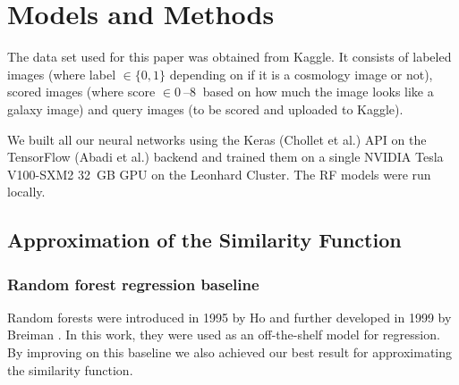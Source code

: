 \documentclass[10pt,conference,compsocconf]{IEEEtran}
\begin{document}


\section{Models and Methods} \label{sec:models_methods}
The data set used for this paper was obtained from Kaggle. It consists of labeled images (where label $\in \{0,1\}$ depending on if it is a cosmology image or not), scored images (where score $\in \SIrange{0}{8}{}$ based on how much the image looks like a galaxy image) and query images (to be scored and uploaded to Kaggle).

We built all our neural networks using the Keras (Chollet et al.\@ \cite{chollet2015keras}) API on the TensorFlow (Abadi et al.\@ \cite{tensorflow2015-whitepaper}) backend and trained them on a single NVIDIA Tesla V100-SXM2 \SI{32}{GB} GPU on the Leonhard Cluster. The RF models were run locally.

\subsection{Approximation of the Similarity Function}

\subsubsection{Random forest regression baseline} 
Random forests were introduced in 1995 by Ho \cite{Ho} and further developed in 1999 by Breiman \cite{Breiman}. In this work, they were used as an off-the-shelf model for regression. By improving on this baseline we also achieved our best result for approximating the similarity function. 
\end{document}
